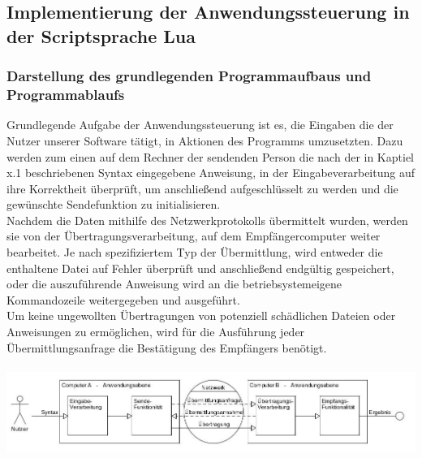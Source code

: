 \documentclass[12pt, a4paper]{scrartcl}
\begin{document}
\subsection{Implementierung der Anwendungssteuerung in der Scriptsprache Lua}

\subsubsection{Darstellung des grundlegenden Programmaufbaus und Programmablaufs}
Grundlegende Aufgabe der Anwendungssteuerung ist es, die Eingaben die der Nutzer unserer Software tätigt, in Aktionen des Programms umzusetzten. Dazu werden zum einen auf dem Rechner der sendenden Person die nach der in Kaptiel x.1 beschriebenen Syntax eingegebene Anweisung, in der Eingabeverarbeitung auf ihre Korrektheit überprüft, um anschließend aufgeschlüsselt zu werden und die gewünschte Sendefunktion zu initialisieren.\\
Nachdem die Daten mithilfe des Netzwerkprotokolls übermittelt wurden, werden sie von der Übertragungsverarbeitung, auf dem Empfängercomputer weiter bearbeitet. Je nach spezifiziertem Typ der Übermittlung, wird entweder die enthaltene Datei auf Fehler überprüft und anschließend endgültig gespeichert, oder die auszuführende Anweisung wird an die betriebsystemeigene Kommandozeile weitergegeben und ausgeführt.\\
Um keine ungewollten Übertragungen von potenziell schädlichen Dateien oder Anweisungen zu ermöglichen, wird für die Ausführung jeder Übermittlungsanfrage die Bestätigung des Empfängers benötigt.\\\hfill\\
\includegraphics[scale=.45]{anw.jpg}
\end{document}
